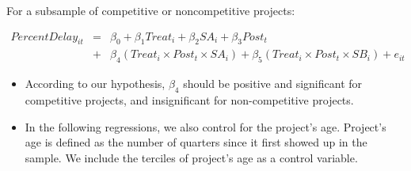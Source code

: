 \documentclass[]{article}
\begin{document}
For a subsample of competitive or noncompetitive projects:

\[ \begin{aligned} PercentDelay_{it} &=& \beta_0 +\beta_1 Treat_i+ \beta_2 SA_i+ \beta_3 Post_t \\&+& \beta_4 (Treat_i \times Post_t \times SA_i )+\beta_5 (Treat_i \times Post_t \times SB_i )+e_{it} \end{aligned} \]

\begin{itemize}
\item
  According to our hypothesis, \(\beta_4\) should be positive and
  significant for competitive projects, and insignificant for
  non-competitive projects.
\item
  In the following regressions, we also control for the project's age.
  Project's age is defined as the number of quarters since it first
  showed up in the sample. We include the terciles of project's age as a
  control variable.
\end{itemize}
\end{document}
